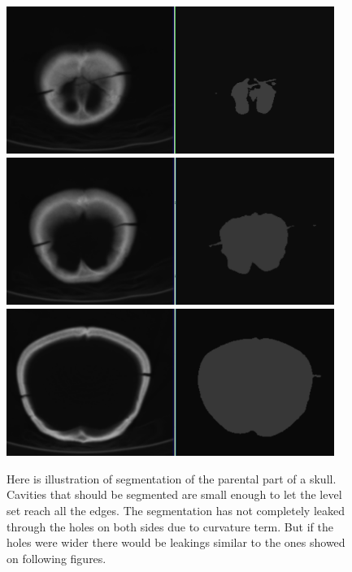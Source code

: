 \begin{figure}
    \centering
    \includegraphics[width=0.95\textwidth]{data/png/2}
    \includegraphics[width=0.95\textwidth]{data/png/4}
    \includegraphics[width=0.95\textwidth]{data/png/7}
    \caption[Result of segmentation of parietal part of a skull]
{
Here is illustration of segmentation of the parental part of a skull.
Cavities that should be segmented are small enough to let the level set reach all the edges.
The segmentation has not completely leaked through the holes on both sides due to curvature term.
But if the holes were wider there would be leakings similar to the ones showed on following figures.
}
    \label{fg:parietalSlicesSegmentation}
\end{figure}

